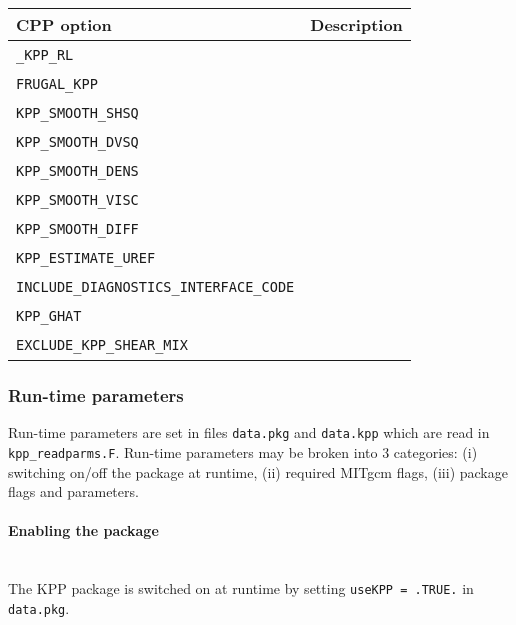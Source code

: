 \begin{table}[h!]
\centering
  \label{tab:pkg:kpp:cpp}
  {\footnotesize
    \begin{tabular}{|l|l|}
      \hline 
      \textbf{CPP option}  &  \textbf{Description}  \\
      \hline \hline
        \texttt{\_KPP\_RL} & 
          ~ \\
        \texttt{FRUGAL\_KPP} & 
          ~ \\
        \texttt{KPP\_SMOOTH\_SHSQ} & 
          ~ \\
        \texttt{KPP\_SMOOTH\_DVSQ} & 
          ~ \\
        \texttt{KPP\_SMOOTH\_DENS} & 
          ~ \\
        \texttt{KPP\_SMOOTH\_VISC} & 
          ~ \\
        \texttt{KPP\_SMOOTH\_DIFF} & 
          ~ \\
        \texttt{KPP\_ESTIMATE\_UREF} & 
          ~ \\
        \texttt{INCLUDE\_DIAGNOSTICS\_INTERFACE\_CODE} & 
          ~ \\
        \texttt{KPP\_GHAT} & 
          ~ \\
        \texttt{EXCLUDE\_KPP\_SHEAR\_MIX} & 
          ~ \\
      \hline
    \end{tabular}
  }
  \caption{~}
\end{table}



\subsubsection{Run-time parameters
\label{sec:pkg:kpp:runtime}}

Run-time parameters are set in files 
\texttt{data.pkg} and \texttt{data.kpp}
which are read in \texttt{kpp\_readparms.F}.
Run-time parameters may be broken into 3 categories:
(i) switching on/off the package at runtime,
(ii) required MITgcm flags,
(iii) package flags and parameters.

\paragraph{Enabling the package}
~ \\
%
The KPP package is switched on at runtime by setting
\texttt{useKPP = .TRUE.} in \texttt{data.pkg}.

